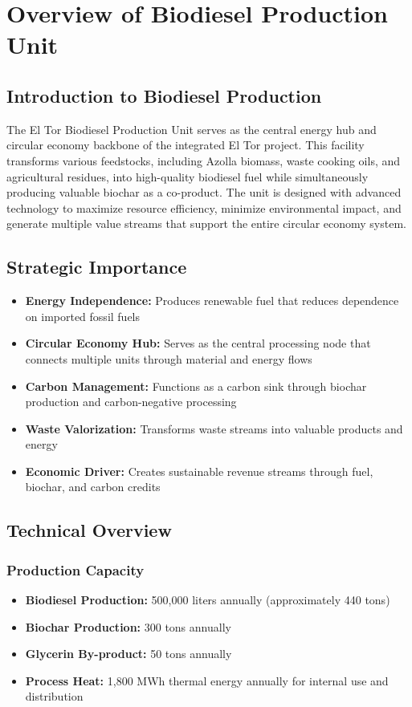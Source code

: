 \section{Overview of Biodiesel Production Unit}

\subsection{Introduction to Biodiesel Production}
The El Tor Biodiesel Production Unit serves as the central energy hub and circular economy backbone of the integrated El Tor project. This facility transforms various feedstocks, including Azolla biomass, waste cooking oils, and agricultural residues, into high-quality biodiesel fuel while simultaneously producing valuable biochar as a co-product. The unit is designed with advanced technology to maximize resource efficiency, minimize environmental impact, and generate multiple value streams that support the entire circular economy system.

\subsection{Strategic Importance}
\begin{itemize}
    \item \textbf{Energy Independence:} Produces renewable fuel that reduces dependence on imported fossil fuels
    \item \textbf{Circular Economy Hub:} Serves as the central processing node that connects multiple units through material and energy flows
    \item \textbf{Carbon Management:} Functions as a carbon sink through biochar production and carbon-negative processing
    \item \textbf{Waste Valorization:} Transforms waste streams into valuable products and energy
    \item \textbf{Economic Driver:} Creates sustainable revenue streams through fuel, biochar, and carbon credits
\end{itemize}

\subsection{Technical Overview}

\subsubsection{Production Capacity}
\begin{itemize}
    \item \textbf{Biodiesel Production:} 500,000 liters annually (approximately 440 tons)
    \item \textbf{Biochar Production:} 300 tons annually
    \item \textbf{Glycerin By-product:} 50 tons annually
    \item \textbf{Process Heat:} 1,800 MWh thermal energy annually for internal use and distribution
\end{itemize}

